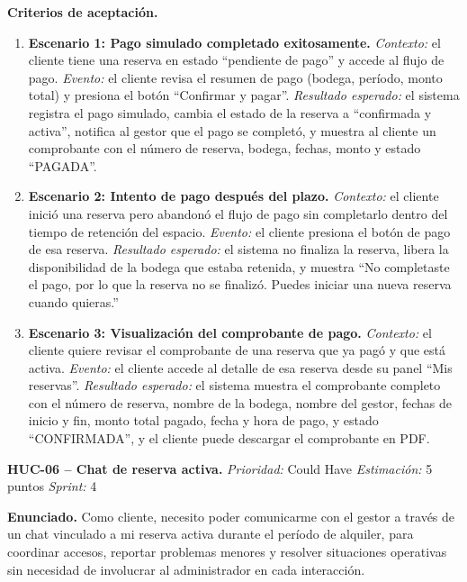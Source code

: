 \textbf{Criterios de aceptación.}
\begin{enumerate}
\item \textbf{Escenario 1: Pago simulado completado exitosamente.} \textit{Contexto:} el cliente tiene una reserva en estado ``pendiente de pago'' y accede al flujo de pago. \textit{Evento:} el cliente revisa el resumen de pago (bodega, período, monto total) y presiona el botón ``Confirmar y pagar''. \textit{Resultado esperado:} el sistema registra el pago simulado, cambia el estado de la reserva a ``confirmada y activa'', notifica al gestor que el pago se completó, y muestra al cliente un comprobante con el número de reserva, bodega, fechas, monto y estado ``PAGADA''.
\item \textbf{Escenario 2: Intento de pago después del plazo.} \textit{Contexto:} el cliente inició una reserva pero abandonó el flujo de pago sin completarlo dentro del tiempo de retención del espacio. \textit{Evento:} el cliente presiona el botón de pago de esa reserva. \textit{Resultado esperado:} el sistema no finaliza la reserva, libera la disponibilidad de la bodega que estaba retenida, y muestra ``No completaste el pago, por lo que la reserva no se finalizó. Puedes iniciar una nueva reserva cuando quieras.''
\item \textbf{Escenario 3: Visualización del comprobante de pago.} \textit{Contexto:} el cliente quiere revisar el comprobante de una reserva que ya pagó y que está activa. \textit{Evento:} el cliente accede al detalle de esa reserva desde su panel ``Mis reservas''. \textit{Resultado esperado:} el sistema muestra el comprobante completo con el número de reserva, nombre de la bodega, nombre del gestor, fechas de inicio y fin, monto total pagado, fecha y hora de pago, y estado ``CONFIRMADA'', y el cliente puede descargar el comprobante en PDF.
\end{enumerate}

\textbf{HUC-06 -- Chat de reserva activa.} \label{req:HUC-06}
\textit{Prioridad:} Could Have \quad \textit{Estimación:} 5 puntos \quad \textit{Sprint:} 4

\textbf{Enunciado.} Como cliente, necesito poder comunicarme con el gestor a través de un chat vinculado a mi reserva activa durante el período de alquiler, para coordinar accesos, reportar problemas menores y resolver situaciones operativas sin necesidad de involucrar al administrador en cada interacción.

